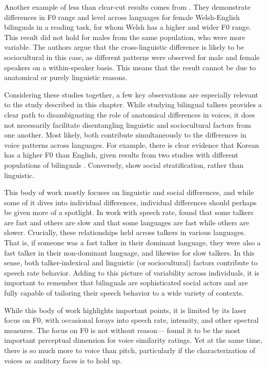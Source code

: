 Another example of less than clear-cut results comes from \citet{ordin_2017_cross}. They demonstrate differences in F0 range and level across languages for female Welsh-English bilinguals in a reading task, for whom Welsh has a higher and wider F0 range. This result did not hold for males from the same population, who were more variable. The authors argue that the cross-linguistic difference is likely to be sociocultural in this case, as different patterns were observed for male and female speakers on a within-speaker basis. This means that the result cannot be due to anatomical or purely linguistic reasons.

Considering these studies together, a few key observations are especially relevant to the study described in this chapter. While studying bilingual talkers provides a clear path to disambiguating the role of anatomical differences in voices, it does not necessarily facilitate disentangling linguistic and sociocultural factors from one another. Most likely, both contribute simultaneously to the differences in voice patterns across languages. For example, there is clear evidence that Korean has a higher F0 than English, given results from two studies with different populations of bilinguals \cite{cheng_2020_f0,lee_2017_bilingual}. Conversely, \cite{ordin_2017_cross} show social stratification, rather than linguistic. 

This body of work mostly focuses on linguistic and social differences, and while some of it dives into individual differences, individual differences should perhaps be given more of a spotlight. In work with speech rate, \citet{bradlow_2017_rate} found that some talkers are fast and others are slow and that some languages are fast while others are slower. Crucially, these relationships held across talkers in various languages. That is, if someone was a fast talker in their dominant language, they were also a fast talker in their non-dominant language, and likewise for slow talkers. In this sense, both talker-indexical and linguistic (or sociocultural) factors contribute to speech rate behavior. Adding to this picture of variability across individuals, it is important to remember that bilinguals are sophisticated social actors and are fully capable of tailoring their speech behavior to a wide variety of contexts. 

While this body of work highlights important points, it is limited by its laser focus on F0, with occasional forays into speech rate, intensity, and other spectral measures. The focus on F0 is not without reason---\citet{perrachione_2019_judgments} found it to be the most important perceptual dimension for voice similarity ratings. Yet at the same time, there is so much more to voice than pitch, particularly if the characterization of voices as auditory faces is to hold up. 

